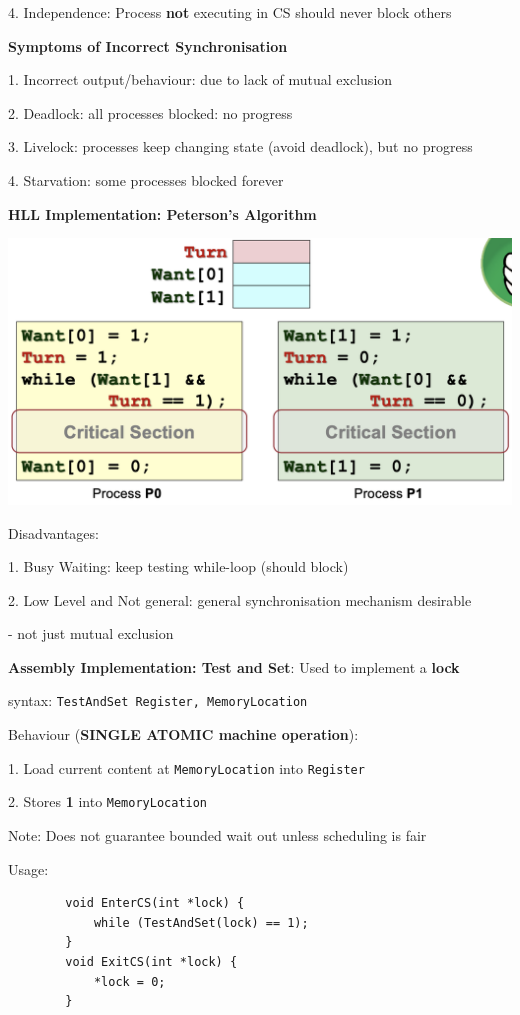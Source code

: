\documentclass[10pt, a4paper]{article}
\newcommand{\highlight}[1]{{\color{red}\textbf{#1}}}
\newcommand{\red}[1]{{\color{red}#1}}
\newcommand{\tab}[0]{\hspace*{2mm}}
\begin{document}
\begin{multicols*}{3}
		4. Independence: Process \highlight{not} executing in CS should never block others

		\textbf{Symptoms of Incorrect Synchronisation}
		
		1. Incorrect output/behaviour: due to lack of mutual exclusion

		2. Deadlock: all processes blocked: no progress

		3. Livelock: processes keep changing state (avoid deadlock), but no progress

		4. Starvation: some processes blocked forever

		\textbf{HLL Implementation: Peterson's Algorithm}

		\includegraphics[scale=.3]{./assets/peterson.png}

		\red{Disadvantages:}

		1. Busy Waiting: keep testing while-loop (should block)

		2. Low Level and Not general: general synchronisation mechanism desirable

		\tab{} - not just mutual exclusion

		\textbf{Assembly Implementation: Test and Set}: Used to implement a \highlight{lock}

		syntax: \texttt{TestAndSet Register, MemoryLocation}
		
		Behaviour (\highlight{SINGLE ATOMIC machine operation}):

		1. Load current content at \texttt{MemoryLocation} into \texttt{Register}

		2. Stores \highlight{1} into \texttt{MemoryLocation}

		Note: Does \red{not} guarantee bounded wait out unless scheduling is fair

		Usage:
		\begin{verbatim}
		void EnterCS(int *lock) {
			while (TestAndSet(lock) == 1);
		}
		void ExitCS(int *lock) {
			*lock = 0;
		}
		\end{verbatim}


\end{multicols*}
\end{document}
